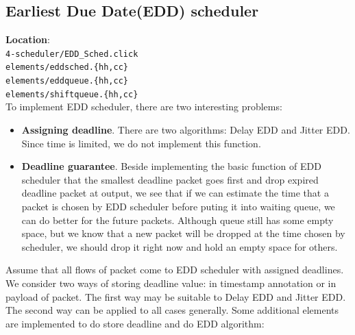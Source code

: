 \documentclass[a4paper]{article}
\begin{document}
  \subsection{Earliest Due Date(EDD) scheduler}
  \textbf{Location}: \\
  \texttt{4-scheduler/EDD\_Sched.click}\\
  \texttt{elements/eddsched.\{hh,cc\}}\\
  \texttt{elements/eddqueue.\{hh,cc\}}\\
  \texttt{elements/shiftqueue.\{hh,cc\}}\\
  To implement EDD scheduler, there are two interesting problems:
  \begin{itemize}
  	\item \textbf{Assigning deadline}. There are two algorithms: Delay EDD and Jitter EDD. Since time is limited, we do not implement this function.
  	\item \textbf{Deadline guarantee}. Beside implementing the basic function of EDD scheduler that the smallest deadline packet goes first and drop expired deadline packet at output, we see that if we can estimate the time that a packet is chosen by EDD scheduler before puting it into waiting queue, we can do better for the future packets. Although queue still has some empty space, but we know that a new packet will be dropped at the time chosen by scheduler, we should drop it right now and hold an empty space for others.
  \end{itemize}
  Assume that all flows of packet come to EDD scheduler with assigned deadlines. We consider two ways of storing deadline value: in timestamp annotation or in payload of packet. The first way may be suitable to Delay EDD and Jitter EDD. The second way can be applied to all cases generally. Some additional elements are implemented to do store deadline and do EDD algorithm:
\end{document}

